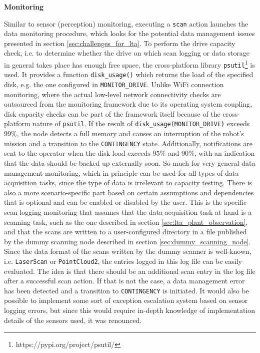 \documentclass[english, master, utf8]{base/thesis_KBS}
\newcommand{\code}[1]{\colorbox{light-gray}{\texttt{#1}}}
\begin{document}
\noindent
\textbf{Monitoring}\newline

\noindent
Similar to sensor (perception) monitoring, executing a \code{scan} action launches the data monitoring procedure, which looks for the potential data management issues presented in
section \ref{sec:challenges_for_lta}. To perform the drive capacity check, i.e. to determine whether the drive on which scan logging or data storage in general takes place has enough
free space, the cross-platform library \code{psutil}\footnote{https://pypi.org/project/psutil/} is used. It provides a function \code{disk\_usage()} which returns the load of the
specified disk, e.g. the one configured in \code{MONITOR\_DRIVE}. Unlike WiFi connection monitoring, where the actual low-level network connectivity checks are outsourced
from the monitoring framework due to its operating system coupling, disk capacity checks can be part of the framework itself because of the cross-platform nature of \code{psutil}.
If the result of \code{disk\_usage(MONITOR\_DRIVE)} exceeds $99\%$, the node detects a full memory and causes an interruption of the robot's mission and a transition to the
\code{CONTINGENCY} state. Additionally, notifications are sent to the operator when the disk load exceeds $95\%$ and $90\%$, with an indication that the data should be backed up
externally soon. So much for very general data management monitoring, which in principle can be used for all types of data acquisition tasks, since the type of data is irrelevant
to capacity testing. There is also a more scenario-specific part based on certain assumptions and dependencies that is optional and can be enabled or disabled by the user.
This is the specific scan logging monitoring that assumes that the data acquisition task at hand is a scanning task, such as the one described in section
\ref{sec:lta_plant_observation}, and that the scans are written to a user-configured directory in a file published by the dummy scanning node described in section
\ref{sec:dummy_scanning_node}. Since the data format of the scans written by the dummy scanner is well-known, i.e. \code{LaserScan} or \code{PointCloud2}, the entries logged in
this log file can be easily evaluated. The idea is that there should be an additional scan entry in the log file after a successful scan action. If that is not the case,
a data management error has been detected and a transition to \code{CONTINGENCY} is initiated. It would also be possible to implement some sort of exception escalation system
based on sensor logging errors, but since this would require in-depth knowledge of implementation details of the sensors used, it was renounced.\newline
\end{document}
